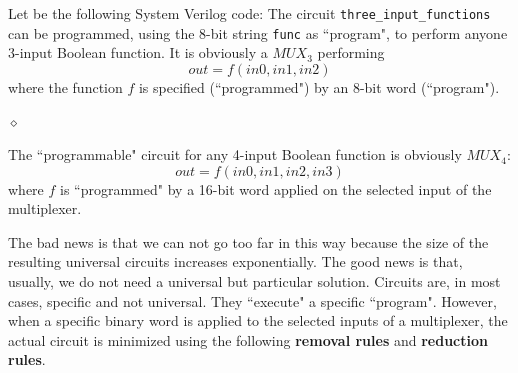 \begin{exemplu}
Let be the following System Verilog code: {\em 
{}
}
 The circuit {\tt three\_input\_functions} can be programmed,
using the 8-bit string {\tt func} as ``program", to perform anyone
3-input Boolean function. It is obviously a $MUX_{3}$ performing
$$out = f(in0, in1, in2)$$
where the function $f$ is specified (``programmed") by an 8-bit
word (``program"). 

$\diamond$
\end{exemplu}

The ``programmable" circuit for any 4-input Boolean function is
obviously $MUX_{4}$:
$$out = f(in0, in1, in2, in3)$$
where $f$ is ``programmed" by a 16-bit word applied on the
selected input of the multiplexer.

The bad news is that we can not go too far in this way because the size
of the resulting universal circuits increases exponentially. The
good news is that, usually, we do not need a universal but particular
solution. Circuits are, in most cases, specific and not
universal. They ``execute" a specific ``program". However, when a
specific binary word is applied to the selected inputs of a
multiplexer, the actual circuit is minimized using the following
{\bf removal rules} and {\bf reduction rules}.

